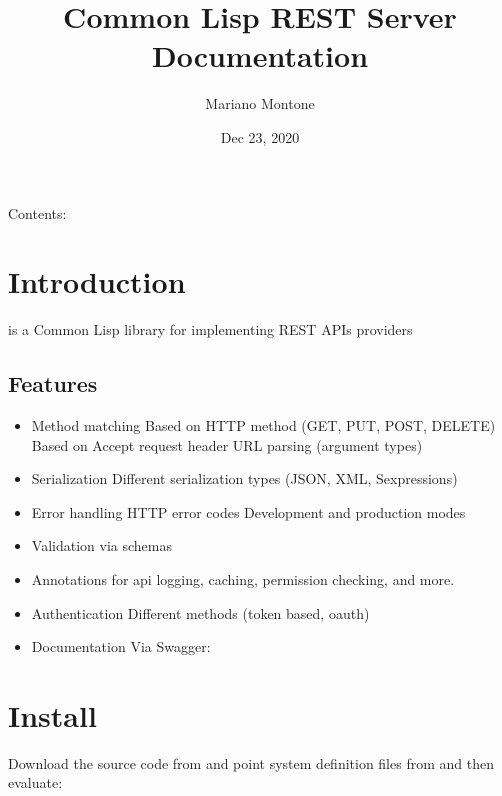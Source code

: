 \documentclass[letterpaper,10pt,english]{sphinxmanual}
\title{Common Lisp REST Server Documentation}
\date{Dec 23, 2020}
\author{Mariano Montone}
\begin{document}
\pagestyle{empty}
\sphinxmaketitle
\pagestyle{plain}
\sphinxtableofcontents
\pagestyle{normal}
\label{\detokenize{index::doc}}


Contents:


\chapter{Introduction}
\label{\detokenize{introduction:introduction}}\label{\detokenize{introduction::doc}}
 is a Common Lisp library for implementing REST APIs providers


\section{Features}
\label{\detokenize{introduction:features}}\begin{itemize}
\item {} 
Method matching
\sphinxhyphen{} Based on HTTP method (GET, PUT, POST, DELETE)
\sphinxhyphen{} Based on Accept request header
\sphinxhyphen{} URL parsing (argument types)

\item {} 
Serialization
\sphinxhyphen{} Different serialization types (JSON, XML, S\sphinxhyphen{}expressions)

\item {} 
Error handling
\sphinxhyphen{} HTTP error codes
\sphinxhyphen{} Development and production modes

\item {} 
Validation via schemas

\item {} 
Annotations for api logging, caching, permission checking, and more.

\item {} 
Authentication
\sphinxhyphen{} Different methods (token based, oauth)

\item {} 
Documentation
\sphinxhyphen{} Via Swagger: 

\end{itemize}


\chapter{Install}
\label{\detokenize{install:install}}\label{\detokenize{install::doc}}
Download the source code from  and point  system definition files from  and then evaluate:
\end{document}
